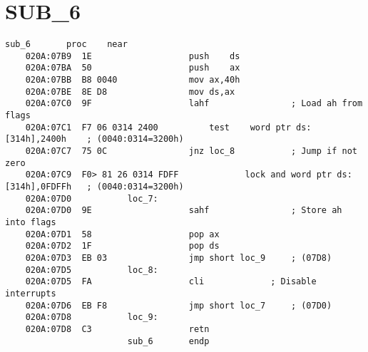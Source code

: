 \documentclass[a4paper,12pt]{bmstu}
\begin{document}
\section{SUB\_6}\label{sec:sub_6}
\begin{lstlisting}[style={asm},label={lst:SUB_6}]
                        sub_6		proc	near
    020A:07B9  1E					push	ds
    020A:07BA  50					push	ax
    020A:07BB  B8 0040				mov	ax,40h
    020A:07BE  8E D8				mov	ds,ax
    020A:07C0  9F					lahf				; Load ah from flags
    020A:07C1  F7 06 0314 2400			test	word ptr ds:[314h],2400h	; (0040:0314=3200h)
    020A:07C7  75 0C				jnz	loc_8			; Jump if not zero
    020A:07C9  F0> 81 26 0314 FDFF	           lock	and	word ptr ds:[314h],0FDFFh	; (0040:0314=3200h)
    020A:07D0			loc_7:
    020A:07D0  9E					sahf				; Store ah into flags
    020A:07D1  58					pop	ax
    020A:07D2  1F					pop	ds
    020A:07D3  EB 03				jmp	short loc_9		; (07D8)
    020A:07D5			loc_8:
    020A:07D5  FA					cli				; Disable interrupts
    020A:07D6  EB F8				jmp	short loc_7		; (07D0)
    020A:07D8			loc_9:
    020A:07D8  C3					retn
                        sub_6		endp
\end{lstlisting}

\clearpage
\end{document}
